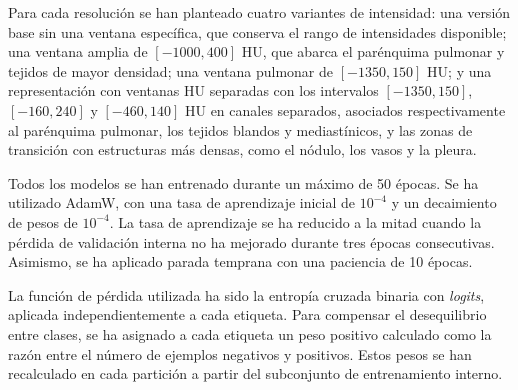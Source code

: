 Para cada resolución se han planteado cuatro variantes de intensidad: una versión base sin una ventana específica, que conserva el rango de intensidades disponible; una ventana amplia de $[-1000,400]$ HU, que abarca el parénquima pulmonar y tejidos de mayor densidad; una ventana pulmonar de $[-1350,150]$ HU; y una representación con ventanas HU separadas con los intervalos $[-1350,150]$, $[-160,240]$ y $[-460,140]$ HU en canales separados, asociados respectivamente al parénquima pulmonar, los tejidos blandos y mediastínicos, y las zonas de transición con estructuras más densas, como el nódulo, los vasos y la pleura.

Todos los modelos se han entrenado durante un máximo de 50 épocas. Se ha utilizado AdamW, con una tasa de aprendizaje inicial de $10^{-4}$ y un decaimiento de pesos de $10^{-4}$. La tasa de aprendizaje se ha reducido a la mitad cuando la pérdida de validación interna no ha mejorado durante tres épocas consecutivas. Asimismo, se ha aplicado parada temprana con una paciencia de 10 épocas.

La función de pérdida utilizada ha sido la entropía cruzada binaria con \textit{logits}, aplicada independientemente a cada etiqueta. Para compensar el desequilibrio entre clases, se ha asignado a cada etiqueta un peso positivo calculado como la razón entre el número de ejemplos negativos y positivos. Estos pesos se han recalculado en cada partición a partir del subconjunto de entrenamiento interno.



